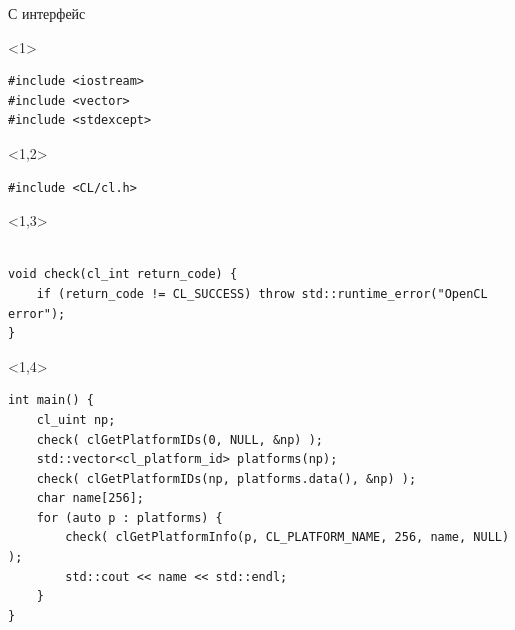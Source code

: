 \documentclass[@BEAMER_OPTIONS@]{beamer}
\begin{document}
\begin{frame}[fragile]{С интерфейс}
    \begin{exampleblock}{}
        \begin{uncoverenv}<1>
            \begin{lstlisting}
#include <iostream>
#include <vector>
#include <stdexcept>
            \end{lstlisting}
        \end{uncoverenv}
        \begin{uncoverenv}<1,2>
            \begin{lstlisting}[firstnumber=last]
#include <CL/cl.h>
            \end{lstlisting}
        \end{uncoverenv}
        \begin{uncoverenv}<1,3>
            \begin{lstlisting}[firstnumber=last]

void check(cl_int return_code) {
    if (return_code != CL_SUCCESS) throw std::runtime_error("OpenCL error");
}
            \end{lstlisting}
        \end{uncoverenv}
        \begin{uncoverenv}<1,4>
            \begin{lstlisting}[firstnumber=last]
int main() {
    cl_uint np;
    check( clGetPlatformIDs(0, NULL, &np) );
    std::vector<cl_platform_id> platforms(np);
    check( clGetPlatformIDs(np, platforms.data(), &np) );
    char name[256];
    for (auto p : platforms) {
        check( clGetPlatformInfo(p, CL_PLATFORM_NAME, 256, name, NULL) );
        std::cout << name << std::endl;
    }
}
            \end{lstlisting}
        \end{uncoverenv}
    \end{exampleblock}
\end{frame}
\end{document}
